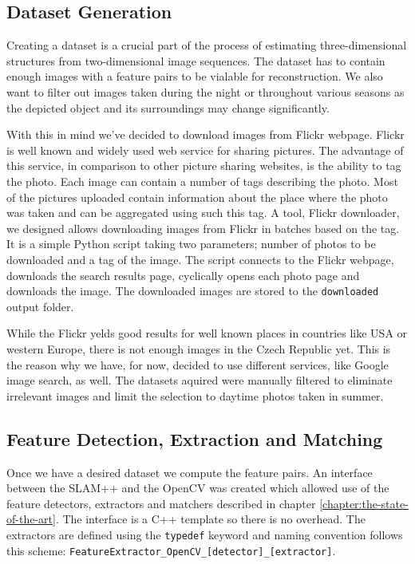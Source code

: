 \subsection*{Dataset Generation}
Creating a dataset is a crucial part of the process of estimating three-dimensional structures from two-dimensional image sequences. The dataset has to contain enough images with a feature pairs to be vialable for reconstruction. We also want to filter out images taken during the night or throughout various seasons as the depicted object and its surroundings may change significantly.

With this in mind we've decided to download images from Flickr webpage. Flickr is well known and widely used web service for sharing pictures. The advantage of this service, in comparison to other picture sharing websites, is the ability to tag the photo. Each image can contain a number of tags describing the photo. Most of the pictures uploaded contain information about the place where the photo was taken and can be aggregated using such this tag. A tool, Flickr downloader, we designed allows downloading images from Flickr in batches based on the tag. It is a simple Python script taking two parameters; number of photos to be downloaded and a tag of the image. The script connects to the Flickr webpage, downloads the search results page, cyclically opens each photo page and downloads the image. The downloaded images are stored to the \texttt{downloaded} output folder.

While the Flickr yelds good results for well known places in countries like USA or western Europe, there is not enough images in the Czech Republic yet. This is the reason why we have, for now, decided to use different services, like Google image search, as well. The datasets aquired were manually filtered to eliminate irrelevant images and limit the selection to daytime photos taken in summer.

\subsection*{Feature Detection, Extraction and Matching}
Once we have a desired dataset we compute the feature pairs. An interface between the SLAM++ and the OpenCV was created which allowed use of the feature detectors, extractors and matchers described in chapter \ref{chapter:the-state-of-the-art}. The interface is a C++ template so there is no overhead. The extractors are defined using the \texttt{typedef} keyword and naming convention follows this scheme: \texttt{FeatureExtractor\_OpenCV\_[detector]\_[extractor]}.

